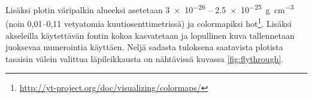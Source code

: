 \documentclass[12pt,a4paper]{article}
\begin{document}
Lisäksi plotin väripalkin alueeksi asetetaan \SI{3e-26}{} -- \SI{2.5e-25}{\gram\per\cubic\centi\metre} (noin 0,01--0,11 vetyatomia kuutiosenttimetrissä)
ja colormapiksi hot\footnote{\url{http://yt-project.org/doc/visualizing/colormaps/}}. Lisäksi akseleilla käytettävän fontin kokoa kasvatetaan ja lopullinen kuva tallennetaan juoksevaa numerointia käyttäen. Neljä sadasta tuloksena saatavista plotista tasaisin välein valittua läpileikkausta on nähtävissä kuvassa \ref{fig:flythrough}.

\begin{minipage}{\linewidth}

\end{minipage}
\end{document}

